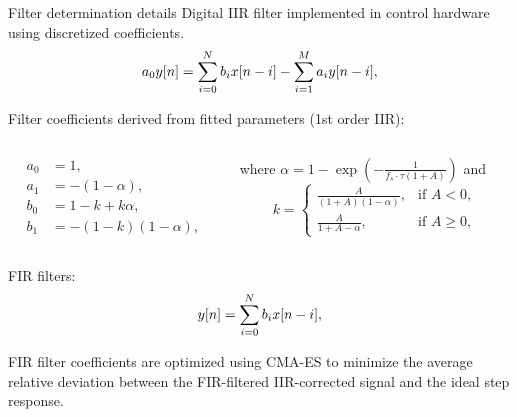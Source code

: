 \documentclass[aspectratio=169,10pt]{beamer}
\begin{document}
\begin{frame}{Filter determination details}
  Digital IIR filter implemented in control hardware using discretized coefficients.
  \begin{equation*}
    \small
    a_0 y[n] = \sum_{i=0}^{N} b_i x[n - i] - \sum_{i=1}^{M} a_i y[n - i],
  \end{equation*}
  
  Filter coefficients derived from fitted parameters (1st order IIR):
  \begin{columns}
    \small
    \begin{column}{0.45\textwidth}
      \begin{align*}
        a_0 &= 1, \\
        a_1 &= -(1 - \alpha), \\
        b_0 &= 1 - k + k \alpha, \\
        b_1 &= -(1 - k)(1 - \alpha),
      \end{align*}
    \end{column}
    \begin{column}{0.55\textwidth}
      \centering
      where $  \alpha = 1 - \exp\left(-\frac{1}{f_s \cdot \tau (1 + A)}\right) $
      and
      \begin{equation*}
          k =
          \begin{cases}
          \frac{A}{(1 + A)(1 - \alpha)}, & \text{if } A < 0, \\
          \frac{A}{1 + A - \alpha}, & \text{if } A \geq 0,
          \end{cases}
      \end{equation*}
    \end{column}
  \end{columns}
  
  FIR filters:
  \begin{equation*}
    \small
        y[n] = \sum_{i=0}^{N} b_i x[n - i],
  \end{equation*}

  FIR filter coefficients are optimized using CMA-ES to minimize the average relative deviation between the FIR-filtered IIR-corrected signal and the ideal step response.

\end{frame}
\end{document}
